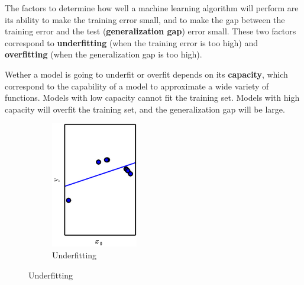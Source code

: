 The factors to determine how well a machine learning algorithm will perform are its ability to make the training error small, and to make the gap between the training error and the test (\textbf{generalization gap}) error small. These two factors correspond to \textbf{underfitting} (when the training error is too high) and \textbf{overfitting} (when the generalization gap is too high).

Wether a model is going to underfit or overfit depends on its \textbf{capacity}, which correspond to the capability of a model to approximate a wide variety of functions. Models with low capacity cannot fit the training set. Models with high capacity will overfit the training set, and the generalization gap will be large.

\begin{figure}
    \centering
    \begin{subfigure}[b]{0.3\textwidth}
        \centering
        \caption{Underfitting}
        \includegraphics[width=\textwidth]{Figures/underfit}

\end{subfigure}
\end{figure}
